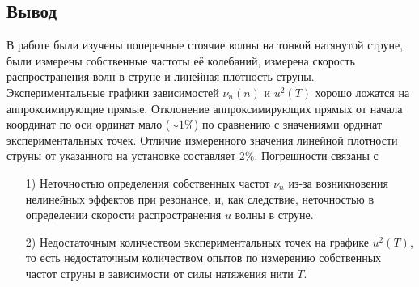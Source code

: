 \documentclass[a4paper, 12pt]{article}
\begin{document}
\begin{center}

    \section*{Вывод}
В работе были изучены поперечные стоячие волны на тонкой натянутой струне, были измерены собственные частоты её колебаний, измерена скорость распространения волн в струне и линейная плотность струны. Экспериментальные графики зависимостей $\nu_n(n)$ и $u^2(T)$ хорошо ложатся на аппроксимирующие прямые. Отклонение аппроксимирующих прямых от начала координат по оси ординат мало ($\sim 1\%$) по сравнению с значениями ординат экспериментальных точек. Отличие измеренного значения линейной плотности струны от указанного на установке составляет $2 \%$.
Погрешности связаны с
\begin{itemize}
\item[1) ] Неточностью определения собственных частот $\nu_n$ из-за возникновения нелинейных эффектов при резонансе, и, как следствие, неточностью в определении скорости распространения $u$ волны в струне.
\item[2) ] Недостаточным количеством экспериментальных точек на графике $u^2(T)$, то есть недостаточным количеством опытов по измерению собственных частот струны в зависимости от силы натяжения нити $T$.
\end{itemize}
\end{center}
 

    
    

    
    
   
\end{document}
